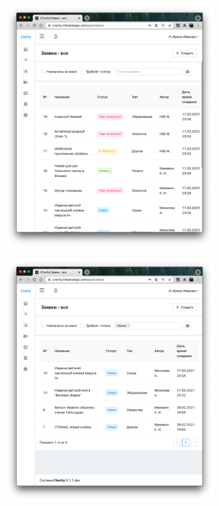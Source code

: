 \documentclass[a4paper,12pt,reqno]{article}
\begin{document}
    \begin{figure}[H]
	    \centering
		\begin{subfigure}[b]{0.475\linewidth}
			\includegraphics[width=\linewidth]{img/ro/app_super.png}
		\end{subfigure}
		\begin{subfigure}[b]{0.475\linewidth}
			\includegraphics[width=\linewidth]{img/ro/app_super_filter.png}

\end{subfigure}
\end{figure}
\end{document}
